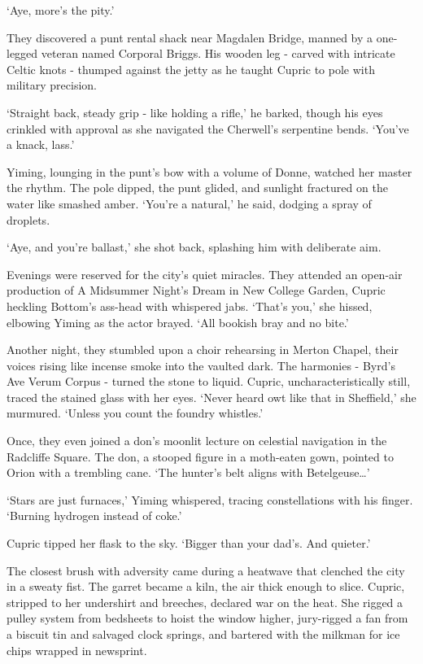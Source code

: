 `Aye, more's the pity.'

They discovered a punt rental shack near Magdalen Bridge, manned by a one-legged veteran named Corporal Briggs. His wooden leg - carved with intricate Celtic knots - thumped against the jetty as he taught Cupric to pole with military precision.

`Straight back, steady grip - like holding a rifle,' he barked, though his eyes crinkled with approval as she navigated the Cherwell's serpentine bends. `You've a knack, lass.'

Yiming, lounging in the punt's bow with a volume of Donne, watched her master the rhythm. The pole dipped, the punt glided, and sunlight fractured on the water like smashed amber. `You're a natural,' he said, dodging a spray of droplets.

`Aye, and you're ballast,' she shot back, splashing him with deliberate aim.

Evenings were reserved for the city's quiet miracles. They attended an open-air production of A Midsummer Night's Dream in New College Garden, Cupric heckling Bottom's ass-head with whispered jabs. `That's you,' she hissed, elbowing Yiming as the actor brayed. `All bookish bray and no bite.'

Another night, they stumbled upon a choir rehearsing in Merton Chapel, their voices rising like incense smoke into the vaulted dark. The harmonies - Byrd's Ave Verum Corpus - turned the stone to liquid. Cupric, uncharacteristically still, traced the stained glass with her eyes. `Never heard owt like that in Sheffield,' she murmured. `Unless you count the foundry whistles.'

Once, they even joined a don's moonlit lecture on celestial navigation in the Radcliffe Square. The don, a stooped figure in a moth-eaten gown, pointed to Orion with a trembling cane. `The hunter's belt aligns with Betelgeuse\dots'

`Stars are just furnaces,' Yiming whispered, tracing constellations with his finger. `Burning hydrogen instead of coke.'

Cupric tipped her flask to the sky. `Bigger than your dad's. And quieter.'

The closest brush with adversity came during a heatwave that clenched the city in a sweaty fist. The garret became a kiln, the air thick enough to slice. Cupric, stripped to her undershirt and breeches, declared war on the heat. She rigged a pulley system from bedsheets to hoist the window higher, jury-rigged a fan from a biscuit tin and salvaged clock springs, and bartered with the milkman for ice chips wrapped in newsprint.

